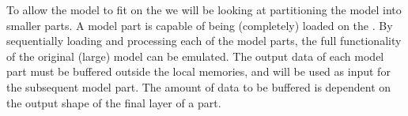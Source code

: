 To allow the model to fit on the \graicore{} we will be looking at partitioning the model into smaller parts.
A model part is capable of being (completely) loaded on the \graicore{}.
By sequentially loading and processing each of the model parts, the full functionality of the original (large) model can be emulated.
The output data of each model part must be buffered outside the local memories, and will be used as input for the subsequent model part.
The amount of data to be buffered is dependent on the output shape of the final layer of a part.


